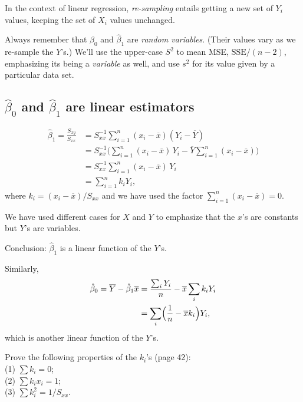 \documentclass[12pt]{article}
\begin{document}
In the context of linear regression,
\emph{re-sampling} entails getting a new set of $Y_i$ values,
keeping the set of $X_i$ values unchanged.

Always remember that $\hat{\beta}_0$
and $\hat{\beta}_1$ are \emph{random variables}.
(Their values vary as we re-sample the $Y$'s.)
We'll use the upper-case $S^2$ to mean MSE, \ie $\text{SSE}/(n-2)$,
emphasizing its being a \emph{variable} as well,
and use $s^2$ for its value given by a particular data set.

\subsection{$\hat{\beta}_0$ and $\hat{\beta}_1$ are linear estimators}

\begin{equation}
\begin{split}
\hat{\beta}_1 = \frac{S_{xy}}{S_{xx}}
    &= S_{xx}^{-1} \sum_{i=1}^n (x_i - \overline{x})(Y_i - \overline{Y})
\\
    &= S_{xx}^{-1} \biggl(
        \sum_{i=1}^n (x_i - \overline{x}) \,Y_i
        - \overline{Y} \sum_{i=1}^n (x_i - \overline{x})
        \biggr)
\\
    &= S_{xx}^{-1} \sum_{i=1}^n (x_i - \overline{x}) \,Y_i
\\
    &= \sum_{i=1}^n k_i Y_i
,
\end{split}
\end{equation}
where $k_i = (x_i - \overline{x}) / S_{xx}$
and we have used the factor
$\sum_{i=1}^n (x_i - \overline{x}) = 0$.

We have used different cases for $X$ and $Y$ to emphasize that
the $x$'s are constants but $Y$'s are variables.

Conclusion:
$\hat{\beta}_1$ is a linear function of the $Y$'s.

Similarly,
\begin{equation}
\begin{split}
\hat{\beta}_0 = \overline{Y} - \hat{\beta}_1 \overline{x}
    &= \frac{\sum_i Y_i}{n} - \overline{x}\sum_i k_i Y_i
\\
    &= \sum_i \Bigl(\frac{1}{n} - \overline{x}k_i\Bigr) Y_i
,
\end{split}
\end{equation}
which is another linear function of the $Y$'s.

\exercise
Prove the following properties of the $k_i$'s (page 42):\\
(1) $\sum k_i = 0$;\\
(2) $\sum k_i x_i = 1$;\\
(3) $\sum k_i^2 = 1 / S_{xx}$.
\end{document}
